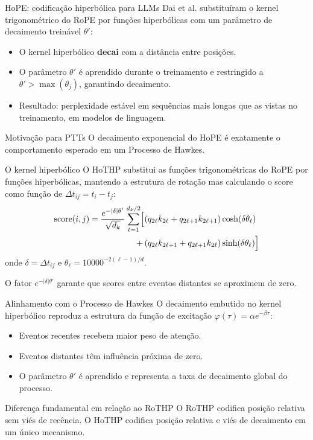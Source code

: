 \documentclass[aspectratio=169]{beamer}
\begin{document}
\begin{frame}{HoPE: codificação hiperbólica para LLMs}
  Dai et al. substituíram o kernel trigonométrico do
  RoPE por funções hiperbólicas com um parâmetro de decaimento treinável
  $\theta'$:
  \begin{itemize}
    \item O kernel hiperbólico \textbf{decai} com a distância entre posições.
    \item O parâmetro $\theta'$ é aprendido durante o treinamento e
          restringido a $\theta' > \max(\theta_j)$, garantindo decaimento.
    \item Resultado: perplexidade estável em sequências mais longas que as
          vistas no treinamento, em modelos de linguagem.
  \end{itemize}
  \begin{block}{Motivação para PTTs}
    O decaimento exponencial do HoPE é exatamente o comportamento esperado
    em um Processo de Hawkes.
  \end{block}
\end{frame}

\begin{frame}{O kernel hiperbólico}
  O HoTHP substitui as funções trigonométricas do RoPE por funções
  hiperbólicas, mantendo a estrutura de rotação mas calculando o score
  como função de $\Delta t_{ij} = t_i - t_j$:
  \begin{align*}
    \text{score}(i,j) = \frac{e^{-|\delta|\theta'}}{\sqrt{d_k}}
      \sum_{\ell=1}^{d_k/2} \Bigl[
        &(q_{2\ell} k_{2\ell} + q_{2\ell+1} k_{2\ell+1}) \cosh(\delta\theta_\ell) \\
        +\, &(q_{2\ell} k_{2\ell+1} + q_{2\ell+1} k_{2\ell}) \sinh(\delta\theta_\ell)
      \Bigr]
  \end{align*}
  onde $\delta = \Delta t_{ij}$ e $\theta_\ell = 10000^{-2(\ell-1)/d}$.

  O fator $e^{-|\delta|\theta'}$ garante que scores entre eventos
  distantes se aproximem de zero.
\end{frame}

\begin{frame}{Alinhamento com o Processo de Hawkes}
  O decaimento embutido no kernel hiperbólico reproduz a estrutura
  da função de excitação $\varphi(\tau) = \alpha e^{-\beta \tau}$:
  \begin{itemize}
    \item Eventos recentes recebem maior peso de atenção.
    \item Eventos distantes têm influência próxima de zero.
    \item O parâmetro $\theta'$ é aprendido e representa a taxa de
          decaimento global do processo.
  \end{itemize}
  \begin{block}{Diferença fundamental em relação ao RoTHP}
    O RoTHP codifica posição relativa sem viés de recência. O HoTHP
    codifica posição relativa e viés de decaimento em um único
    mecanismo.
  \end{block}
\end{frame}
\end{document}
